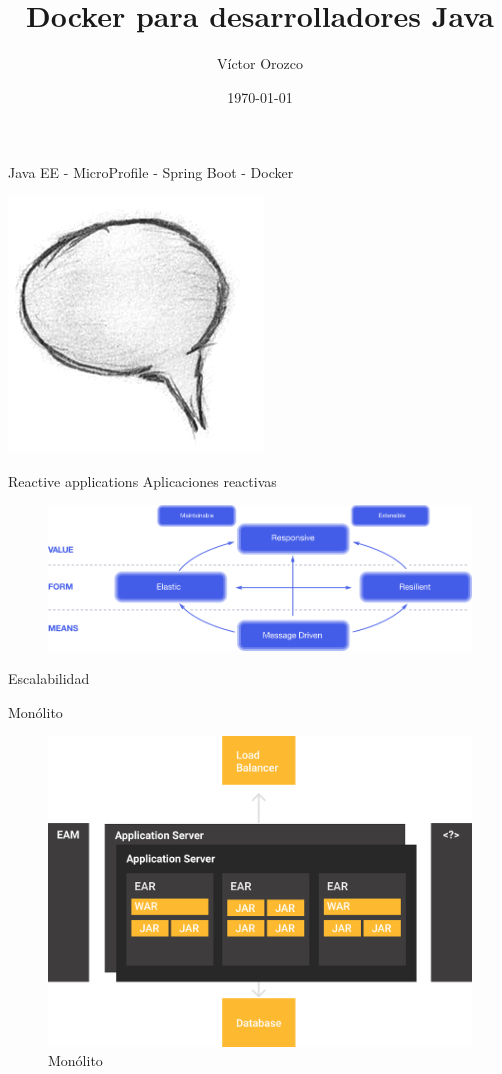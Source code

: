 \documentclass{beamer}
\title{Docker para desarrolladores Java}
\author{Víctor Orozco}
\institute{@tuxtor}
\date{\today}
\begin{document}
\frame{\titlepage}

\begin{frame}{Java EE - MicroProfile - Spring Boot - Docker}
\begin{center}
	\includegraphics[width=0.4\linewidth]{Images/comment}
\end{center}
\end{frame}


\begin{frame}{Reactive applications}
Aplicaciones reactivas
\begin{figure}
	\centering
	\includegraphics[width=\linewidth]{Images/reactive-traits}
\end{figure}
Escalabilidad
\end{frame}

\begin{frame}{Monólito}
\begin{figure}
	\centering
	\includegraphics[width=0.7\linewidth]{Images/monolitos}
	\caption{Monólito}
\end{figure}
\end{frame}
\end{document}
